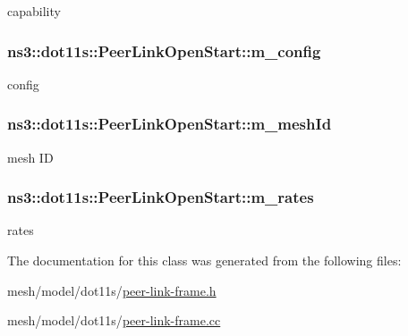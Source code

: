 capability 

\subsubsection[{\texorpdfstring{m\+\_\+config}{m_config}}]{ ns3\+::dot11s\+::\+Peer\+Link\+Open\+Start\+::m\+\_\+config\hspace{0.3cm}{\ttfamily [private]}}\hypertarget{classns3_1_1dot11s_1_1PeerLinkOpenStart_ac16230ae21c59ff5b78ef0a435f54a02}{}\label{classns3_1_1dot11s_1_1PeerLinkOpenStart_ac16230ae21c59ff5b78ef0a435f54a02}


config 

\subsubsection[{\texorpdfstring{m\+\_\+mesh\+Id}{m_meshId}}]{ ns3\+::dot11s\+::\+Peer\+Link\+Open\+Start\+::m\+\_\+mesh\+Id\hspace{0.3cm}{\ttfamily [private]}}\hypertarget{classns3_1_1dot11s_1_1PeerLinkOpenStart_ac08a3117099028d7a87d2a4f28122509}{}\label{classns3_1_1dot11s_1_1PeerLinkOpenStart_ac08a3117099028d7a87d2a4f28122509}


mesh ID 

\subsubsection[{\texorpdfstring{m\+\_\+rates}{m_rates}}]{ ns3\+::dot11s\+::\+Peer\+Link\+Open\+Start\+::m\+\_\+rates\hspace{0.3cm}{\ttfamily [private]}}\hypertarget{classns3_1_1dot11s_1_1PeerLinkOpenStart_aaa7ddece8c5a8e4cf2b2e1016f388840}{}\label{classns3_1_1dot11s_1_1PeerLinkOpenStart_aaa7ddece8c5a8e4cf2b2e1016f388840}


rates 



The documentation for this class was generated from the following files\+:\begin{DoxyCompactItemize}
\item 
mesh/model/dot11s/\hyperlink{peer-link-frame_8h}{peer-\/link-\/frame.\+h}\item 
mesh/model/dot11s/\hyperlink{peer-link-frame_8cc}{peer-\/link-\/frame.\+cc}\end{DoxyCompactItemize}
